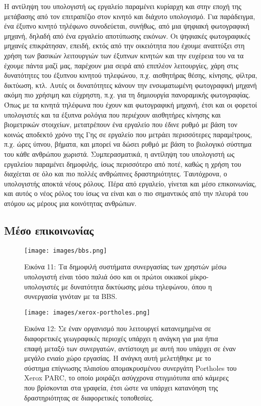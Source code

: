 \documentclass[
]{article}
\begin{document}
Η αντίληψη του υπολογιστή ως εργαλείο παραμένει κυρίαρχη και στην εποχή
της μετάβασης από τον επιτραπέζιο στον κινητό και διάχυτο υπολογισμό.
Για παράδειγμα, ένα έξυπνο κινητό τηλέφωνο συνοδεύεται, συνήθως, από μια
ψηφιακή φωτογραφική μηχανή, δηλαδή από ένα εργαλείο αποτύπωσης εικόνων.
Οι ψηφιακές φωτογραφικές μηχανές επικράτησαν, επειδή, εκτός από την
οικειότητα που έχουμε αναπτύξει στη χρήση των βασικών λειτουργιών των
έξυπνων κινητών και την ευχέρεια του να τα έχουμε πάντα μαζί μας,
παρέχουν μια σειρά από επιπλέον λειτουργίες, χάρη στις δυνατότητες του
έξυπνου κινητού τηλεφώνου, π.χ. αισθητήρας θέσης, κίνησης, φίλτρα,
δικτύωση, κτλ. Αυτές οι δυνατότητες κάνουν την ενσωματωμένη φωτογραφική
μηχανή ακόμη πιο χρήσιμη και εύχρηστη, π.χ. για τη δημιουργία
πανοραμικής φωτογραφίας. Όπως με τα κινητά τηλέφωνα που έχουν και
φωτογραφική μηχανή, έτσι και οι φορετοί υπολογιστές και τα έξυπνα
ρολόγια που περιέχουν αισθητήρες κίνησης και βιομετρικών στοιχείων,
μετατρέπουν ένα εργαλείο που έδινε ρυθμό με βάση τον κοινώς αποδεκτό
χρόνο της Γης σε εργαλείο που μετράει περισσότερες παραμέτρους, π.χ.
ώρες ύπνου, βήματα, και μπορεί να δώσει ρυθμό με βάση το βιολογικό
σύστημα του κάθε ανθρώπου χωριστά. Συμπερασματικά, η αντίληψη του
υπολογιστή ως εργαλείου παραμένει δημοφιλής, ίσως περισσότερο από ποτέ,
καθώς η χρήση του διαχέεται σε όλο και πιο πολλές ανθρώπινες
δραστηριότητες. Ταυτόχρονα, ο υπολογιστής αποκτά νέους ρόλους. Πέρα από
εργαλείο, γίνεται και μέσο επικοινωνίας, και αυτός ο νέος ρόλος του ίσως
να είναι και ο πιο σημαντικός από την πλευρά του ατόμου ως μέρους μια
κοινότητας ανθρώπων.

\hypertarget{ux3bcux3adux3c3ux3bf-ux3b5ux3c0ux3b9ux3baux3bfux3b9ux3bdux3c9ux3bdux3afux3b1ux3c2}{%
\subsection{Μέσο
επικοινωνίας}\label{ux3bcux3adux3c3ux3bf-ux3b5ux3c0ux3b9ux3baux3bfux3b9ux3bdux3c9ux3bdux3afux3b1ux3c2}}

\leavevmode{}%
\begin{figure}
\hypertarget{fig:bbs}{%
\centering
\texttt{[image: images/bbs.png]}
\caption{Εικόνα 11: Τα δημοφιλή συστήματα συνεργασίας των χρηστών μέσω
υπολογιστή είναι τόσο παλιά όσο και οι πρώτοι οικιακοί μίκρο-υπολογιστές
με δυνατότητα δικτύωσης μέσω τηλεφώνου, όπου η συνεργασία γινόταν με τα
BBS.}\label{fig:bbs}
}
\end{figure}

\leavevmode{}%
\begin{figure}
\hypertarget{fig:xerox-portholes}{%
\centering
\texttt{[image: images/xerox-portholes.png]}
\caption{Εικόνα 12: Σε έναν οργανισμό που λειτουργεί κατανεμημένα σε
διαφορετικές γεωγραφικές περιοχές υπάρχει η ανάγκη για μια ήπια επαφή
μεταξύ των συνεργατών, αντίστοιχη με αυτή που υπάρχει σε έναν μεγάλο
ενιαίο χώρο εργασίας. Η ανάγκη αυτή μελετήθηκε με το σύστημα επίγνωσης
πλαισίου απομακρυσμένου συνεργάτη Portholes του Xerox PARC, το οποίο
μοιράζει ασύγχρονα στιγμιότυπα από κάμερες που βρίσκονται στα γραφεία,
έτσι ώστε να υπάρχει κατανόηση της δραστηριότητας σε διαφορετικές
τοποθεσίες.}\label{fig:xerox-portholes}
}
\end{figure}
\end{document}
